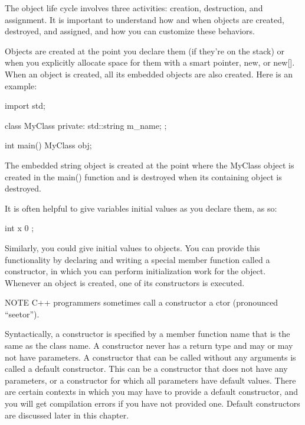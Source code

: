 
The object life cycle involves three activities: creation, destruction, and assignment. It is important to understand how and when objects are created, destroyed, and assigned, and how you can customize these behaviors.


Objects are created at the point you declare them (if they’re on the stack) or when you explicitly allocate space for them with a smart pointer, new, or new[]. When an object is created, all its embedded objects are also created. Here is an example:

\begin{cpp}
import std;

class MyClass
{
    private:
    std::string m_name;
};

int main()
{
    MyClass obj;
}
\end{cpp}

The embedded string object is created at the point where the MyClass object is created in the main() function and is destroyed when its containing object is destroyed.

It is often helpful to give variables initial values as you declare them, as so:

\begin{cpp}
int x { 0 };
\end{cpp}

Similarly, you could give initial values to objects. You can provide this functionality by declaring and writing a special member function called a constructor, in which you can perform initialization work for the object. Whenever an object is created, one of its constructors is executed.

\begin{myNotic}{NOTE}
C++ programmers sometimes call a constructor a ctor (pronounced “seetor”).
\end{myNotic}


Syntactically, a constructor is specified by a member function name that is the same as the class name.
A constructor never has a return type and may or may not have parameters. A constructor that can be called without any arguments is called a default constructor. This can be a constructor that does not have any parameters, or a constructor for which all parameters have default values. There are certain contexts in which you may have to provide a default constructor, and you will get compilation errors if you have not provided one. Default constructors are discussed later in this chapter.

